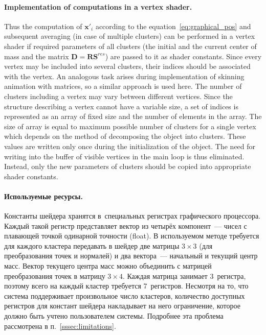 \documentclass[a4paper, 12pt, titlepage]{extarticle}
\newcommand{\vect}[1]{\mathbf{#1}} %
\newcommand{\matx}[1]{\mathbf{#1}} %
\begin{document}
        \paragraph{Implementation of computations in a vertex shader.}
        Thus the computation of $\vect{x}'_i$ according to the equation~\eqref{eq:graphical_pos} and
        subsequent averaging (in case of multiple clusters) can be performed in a vertex shader if
        required parameters of all clusters (the initial and the current center of mass and the
        matrix $\matx D = \matx{R} \matx{S}^{res}$) are passed to it as shader constants. Since
        every vertex may be included into several clusters, their indices should be associated with
        the vertex. An analogous task arises during implementation of skinning animation with
        matrices, so a similar approach is used here. The number of clusters including
        a vertex may vary between different vertices. Since the structure describing a vertex cannot
        have a variable size, a set of indices is represented as an array of fixed size and the
        number of elements in the array. The size of array is equal to maximum possible number of
        clusters for a single vertex which depends on the method of decomposing the object into
        clusters. These values are written only once during the initialization of the object. The
        need for writing into the buffer of visible vertices in the main loop is thus eliminated.
        Instead, only the new parameters of clusters should be copied into appropriate shader constants.

\begin{original}
        \paragraph{Используемые ресурсы.}
        Константы шейдера хранятся в~специальных регистрах графического процессора. Каждый такой регистр
        представляет вектор из четырёх компонент~--- чисел с плавающей точкой одинарной точности
        (float). В используемом методе требуется для каждого
        кластера передавать в шейдер две матрицы $3 \times 3$ (для преобразования точек и нормалей) и два
        вектора~--- начальный и текущий центр масс. Вектор текущего центра масс можно объединить с
        матрицей преобразования точек в матрицу $3 \times 4$. Каждая матрица занимает 3~регистра,
        поэтому всего на каждый кластер требуется 7~регистров. Несмотря на то, что система
        поддерживает произвольное число кластеров, количество доступных регистров для констант
        шейдера накладывает на него ограничение, которое должно быть учтено пользователем системы.
        Подробнее эта проблема рассмотрена в п.~\ref{sssec:limitations}.
\end{original}
\end{document}
